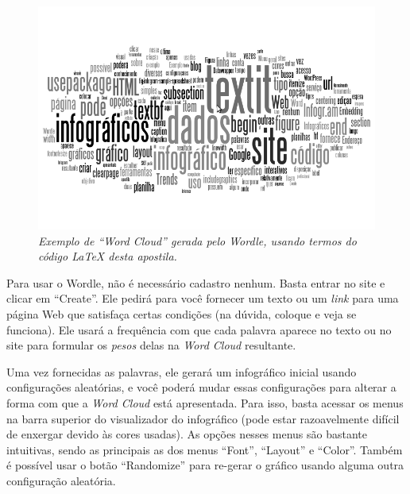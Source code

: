 \documentclass[12pt,onecolumn]{article}
\begin{document}
    \begin{figure}[ht]
      \centering
      \includegraphics[width=.9\linewidth]{wordle-1.png}
      \caption{
        \footnotesize
        \it
        Exemplo de ``Word Cloud'' gerada pelo Wordle, usando termos do código
        LaTeX desta apostila.
      }
      \label{fig:wordle-1}
    \end{figure}
    
    Para usar o Wordle, não é necessário cadastro nenhum. Basta entrar no site e
    clicar em ``Create''. Ele pedirá para você fornecer um texto ou um
    \textit{link} para uma página Web que satisfaça certas condições (na dúvida,
    coloque e veja se funciona). Ele usará a frequência com que cada palavra
    aparece no texto ou no site para formular os \textit{pesos} delas na
    \textit{Word Cloud} resultante.
    
    Uma vez fornecidas as palavras, ele gerará um infográfico inicial usando
    configurações aleatórias, e você poderá mudar essas configurações para
    alterar a forma com que a \textit{Word Cloud} está apresentada. Para isso,
    basta acessar os menus na barra superior do visualizador do infográfico
    (pode estar razoavelmente difícil de enxergar devido às cores usadas). As
    opções nesses menus são bastante intuitivas, sendo as principais as dos
    menus ``Font'', ``Layout'' e ``Color''. Também é possível usar o botão
    ``Randomize'' para re-gerar o gráfico usando alguma outra configuração aleatória.
    
\end{document}
